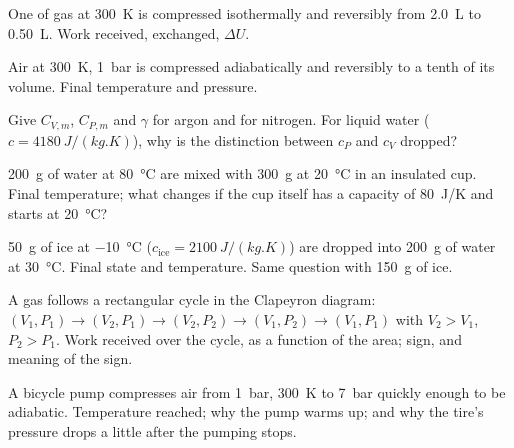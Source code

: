 \begin{exercise}[$\star$]\label{exo:b1:first-law:2}
One  of gas at \qty{300}{K} is compressed isothermally and
reversibly from \qty{2.0}{L} to \qty{0.50}{L}. Work received, 
exchanged, $\Delta U$.
\end{exercise}

\begin{exercise}[$\star$]\label{exo:b1:first-law:3}
Air at \qty{300}{K}, \qty{1}{bar} is compressed adiabatically and
reversibly to a tenth of its volume. Final temperature and pressure.
\end{exercise}

\begin{exercise}[$\star$]\label{exo:b1:first-law:4}
Give $C_{V,m}$, $C_{P,m}$ and $\gamma$ for argon and for nitrogen. For
liquid water ($c = \qty{4180}{J/(kg.K)}$), why is the distinction between
$c_P$ and $c_V$ dropped?
\end{exercise}

\begin{exercise}[$\star\star$]\label{exo:b1:first-law:5}
\qty{200}{g} of water at \qty{80}{\degreeCelsius} are mixed with \qty{300}{g}
at \qty{20}{\degreeCelsius} in an insulated cup. Final temperature; what
changes if the cup itself has a  capacity of \qty{80}{J/K} and starts
at \qty{20}{\degreeCelsius}?
\end{exercise}

\begin{exercise}[$\star\star$]\label{exo:b1:first-law:6}
\qty{50}{g} of ice at \qty{-10}{\degreeCelsius} ($c_{\text{ice}} = \qty{2100}{J/(kg.K)}$)
are dropped into \qty{200}{g} of water at \qty{30}{\degreeCelsius}. Final
state and temperature. Same question with \qty{150}{g} of ice.
\end{exercise}

\begin{exercise}[$\star\star$]\label{exo:b1:first-law:7}
A gas follows a rectangular cycle in the Clapeyron diagram: $(V_1, P_1)
\to (V_2, P_1) \to (V_2, P_2) \to (V_1, P_2) \to (V_1, P_1)$ with $V_2 > V_1$,
$P_2 > P_1$. Work received over the cycle, as a function of the area;
sign, and meaning of the sign.
\end{exercise}

\begin{exercise}[$\star\star$]\label{exo:b1:first-law:8}
A bicycle pump compresses air from \qty{1}{bar}, \qty{300}{K} to
\qty{7}{bar} quickly enough to be adiabatic. Temperature reached; why the
pump warms up; and why the tire's pressure drops a little after the
pumping stops.
\end{exercise}

